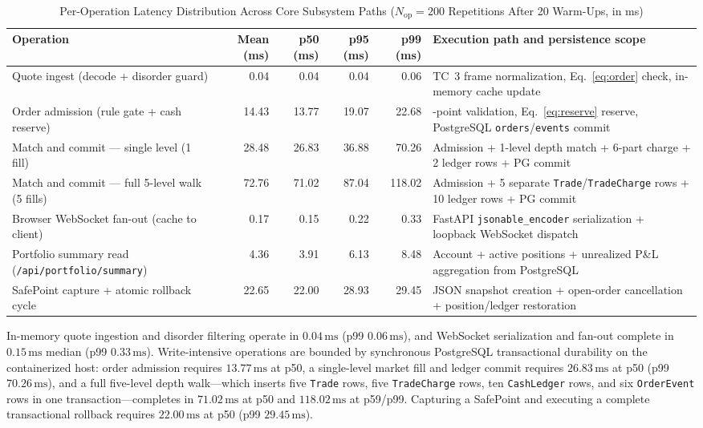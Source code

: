 \documentclass[12pt]{article}
\newcommand{\thinunit}[2]{#1\,\text{#2}}
\begin{document}
\begin{table}[!htbp]\begin{singlespace}
\caption{Per-Operation Latency Distribution Across Core Subsystem Paths ($N_{\mathrm{op}}=200$ Repetitions After 20 Warm-Ups, in ms)}
\label{tab:latency}
\centering
\small
\renewcommand{\arraystretch}{1.12}
\begin{tabularx}{\textwidth}{@{}>{\raggedright\arraybackslash}p{2.35in} r r r r >{\raggedright\arraybackslash}X@{}}
\toprule
Operation & Mean (ms) & p50 (ms) & p95 (ms) & p99 (ms) & Execution path and persistence scope \\
\midrule
Quote ingest (decode + disorder guard) & 0.04 & 0.04 & 0.04 & 0.06 & TC~3 frame normalization, Eq.~\eqref{eq:order} check, in-memory cache update \\
Order admission (rule gate + cash reserve) & 14.43 & 13.77 & 19.07 & 22.68 & 8-point validation, Eq.~\eqref{eq:reserve} reserve, PostgreSQL \texttt{orders}/\texttt{events} commit \\
Match and commit --- single level (1 fill) & 28.48 & 26.83 & 36.88 & 70.26 & Admission + 1-level depth match + 6-part charge + 2 ledger rows + PG commit \\
Match and commit --- full 5-level walk (5 fills) & 72.76 & 71.02 & 87.04 & 118.02 & Admission + 5 separate \texttt{Trade}/\texttt{TradeCharge} rows + 10 ledger rows + PG commit \\
Browser WebSocket fan-out (cache to client) & 0.17 & 0.15 & 0.22 & 0.33 & FastAPI \texttt{jsonable\_encoder} serialization + loopback WebSocket dispatch \\
Portfolio summary read (\texttt{/api/portfolio/summary}) & 4.36 & 3.91 & 6.13 & 8.48 & Account + active positions + unrealized P\&L aggregation from PostgreSQL \\
SafePoint capture + atomic rollback cycle & 22.65 & 22.00 & 28.93 & 29.45 & JSON snapshot creation + open-order cancellation + position/ledger restoration \\
\bottomrule
\end{tabularx}
\end{singlespace}\end{table}

In-memory quote ingestion and disorder filtering operate in $\thinunit{0.04}{ms}$ (p99 $\thinunit{0.06}{ms}$), and WebSocket serialization and fan-out complete in $\thinunit{0.15}{ms}$ median (p99 $\thinunit{0.33}{ms}$). Write-intensive operations are bounded by synchronous PostgreSQL transactional durability on the containerized host: order admission requires $\thinunit{13.77}{ms}$ at p50, a single-level market fill and ledger commit requires $\thinunit{26.83}{ms}$ at p50 (p99 $\thinunit{70.26}{ms}$), and a full five-level depth walk—which inserts five \texttt{Trade} rows, five \texttt{TradeCharge} rows, ten \texttt{CashLedger} rows, and six \texttt{OrderEvent} rows in one transaction—completes in $\thinunit{71.02}{ms}$ at p50 and $\thinunit{118.02}{ms}$ at p59/p99. Capturing a SafePoint and executing a complete transactional rollback requires $\thinunit{22.00}{ms}$ at p50 (p99 $\thinunit{29.45}{ms}$).
\end{document}

